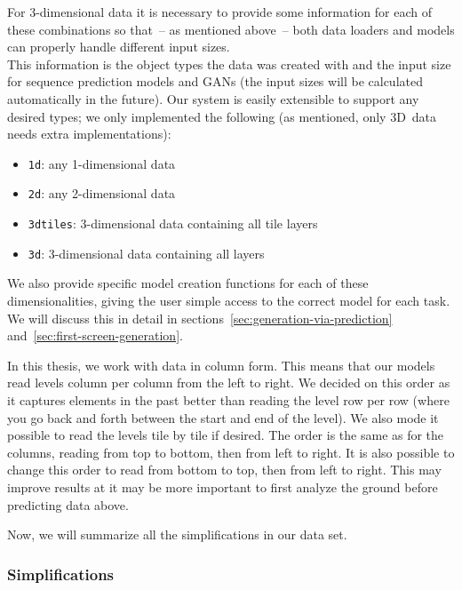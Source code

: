 For 3-dimensional data it is necessary to provide some information for
each of these combinations so that~-- as mentioned above~-- both data
loaders and models can properly handle different input sizes. \\
This information is the object types the data was created with and the
input size for sequence prediction models and GANs (the input sizes
will be calculated automatically in the future). Our system is easily
extensible to support any desired types; we only implemented the
following (as mentioned, only 3D~data needs extra implementations):
\begin{itemize}
\item \texttt{1d}: any 1-dimensional data
\item \texttt{2d}: any 2-dimensional data
\item \texttt{3dtiles}: 3-dimensional data containing all tile layers
\item \texttt{3d}: 3-dimensional data containing all layers
\end{itemize}
We also provide specific model creation functions for each of these
dimensionalities, giving the user simple access to the correct model
for each task. We will discuss this in detail in
sections~\ref{sec:generation-via-prediction}
and~\ref{sec:first-screen-generation}.

In this thesis, we work with data in column form. This means that our
models read levels column per column from the left to right. We
decided on this order as it captures elements in the past better than
reading the level row per row (where you go back and forth between the
start and end of the level). We also mode it possible to read the
levels tile by tile if desired. The order is the same as for the
columns, reading from top to bottom, then from left to right. It is
also possible to change this order to read from bottom to top, then
from left to right. This may improve results at it may be more
important to first analyze the ground before predicting data above.

Now, we will summarize all the simplifications in our data set.

\subsubsection{Simplifications}
\label{sec:simplifications}


